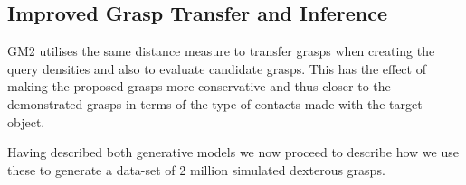\subsection{Improved Grasp Transfer and Inference}
GM2 utilises the same distance measure to transfer grasps when creating the query densities and also to evaluate candidate grasps. This has the effect of making the proposed grasps more conservative and thus closer to the demonstrated grasps in terms of the type of contacts made with the target object.

Having described both generative models we now proceed to describe how we use these to generate a data-set of 2 million simulated dexterous grasps.